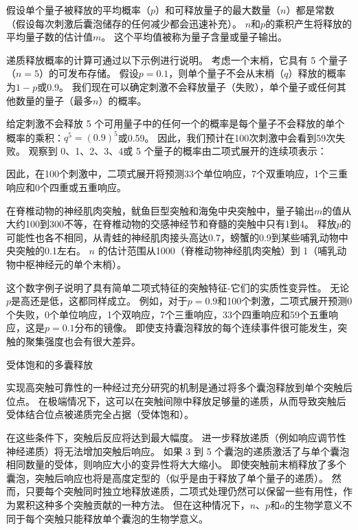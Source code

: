 \begin{proposition}[突触强度取决于递质释放的概率和其他量子参数]
	\quad \quad 假设单个量子被释放的平均概率（$ p $）和可释放量子的最大数量（$ n $）都是常数（假设每次刺激后囊泡储存的任何减少都会迅速补充）。
	$ n $和$ p $的乘积产生将释放的平均量子数的估计值$ m $。
	这个平均值被称为量子含量或量子输出。
	
	\quad \quad 递质释放概率的计算可通过以下示例进行说明。
	考虑一个末梢，它具有 5 个量子（$ n=5 $）的可发布存储。
	假设$ p=0.1 $，则单个量子不会从末梢（$ q $）释放的概率为$ 1-p $或0.9。
	我们现在可以确定刺激不会释放量子（失败），单个量子或任何其他数量的量子（最多$ n $）的概率。
	
	\quad \quad 给定刺激不会释放 5 个可用量子中的任何一个的概率是每个量子不会释放的单个概率的乘积：$ q^5 = (0.9)^5 $或0.59。
	因此，我们预计在100次刺激中会看到59次失败。
	观察到 0、1、2、3、4或 5 个量子的概率由二项式展开的连续项表示：
	
	\quad \quad 因此，在100个刺激中，二项式展开将预测33个单位响应，7个双重响应，1个三重响应和0个四重或五重响应。
	
	\quad \quad 在脊椎动物的神经肌肉突触，鱿鱼巨型突触和海兔中央突触中，量子输出$m$的值从大约100到300不等，在脊椎动物的交感神经节和脊髓的突触中只有1到4。
	释放$ p $的可能性也各不相同，从青蛙的神经肌肉接头高达0.7，螃蟹的0.9到某些哺乳动物中央突触的0.1左右。
	$n$ 的估计范围从1000（脊椎动物神经肌肉突触）到 1（哺乳动物中枢神经元的单个末梢）。
	
	\quad \quad 这个数字例子说明了具有简单二项式特征的突触特征-它们的实质性变异性。
	无论$p$是高还是低，这都同样成立。
	例如，对于$ p=0.9 $和100个刺激，二项式展开预测0个失败，0个单位响应，1个双响应，7个三重响应，33个四重响应和59个五重响应，这是$ p=0.1 $分布的镜像。
	即使支持囊泡释放的每个连续事件很可能发生，突触的聚集强度也会有很大差异。
	
	\quad \quad 受体饱和的多囊释放
	
	\quad \quad 实现高突触可靠性的一种经过充分研究的机制是通过将多个囊泡释放到单个突触后位点。
	在极端情况下，这可以在突触间隙中释放足够量的递质，从而导致突触后受体结合位点被递质完全占据（受体饱和）。
	
	\quad \quad 在这些条件下，突触后反应将达到最大幅度。
	进一步释放递质（例如响应调节性神经递质）将无法增加突触后响应。
	如果 3 到 5 个囊泡的递质激活了与单个囊泡相同数量的受体，则响应大小的变异性将大大缩小。
	即使突触前末梢释放了多个囊泡，突触后响应也将是高度定型的（似乎是由于释放了单个量子的递质）。
	然而，只要每个突触同时独立地释放递质，二项式处理仍然可以保留一些有用性，作为累积这种多个突触贡献的一种方法。
	但在这种情况下，$ n $、$ p $和$ a $的生物学意义不同于每个突触只能释放单个囊泡的生物学意义。
	
\end{proposition}



